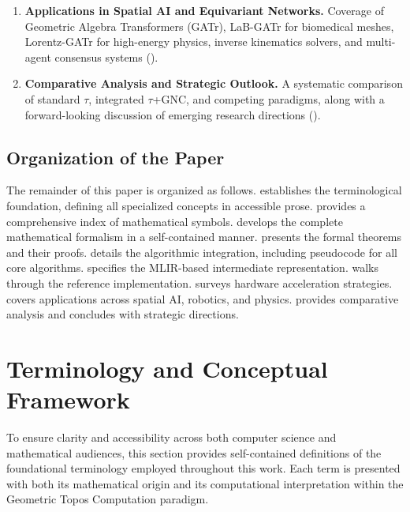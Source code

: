 \documentclass[manuscript, nonacm, review=false]{acmart}
\theoremstyle{definition}
\theoremstyle{plain}
\newcommand{\toposLang}{\ensuremath{\tau}\text{-Lang}}
\begin{document}
\begin{enumerate}[label=\textbf{C\arabic*.}]
    \item \textbf{Applications in Spatial AI and Equivariant Networks.} Coverage of Geometric Algebra Transformers (GATr), LaB-GATr for biomedical meshes, Lorentz-GATr for high-energy physics, inverse kinematics solvers, and multi-agent consensus systems ().
    
    \item \textbf{Comparative Analysis and Strategic Outlook.} A systematic comparison of standard \toposLang{}, integrated \toposLang{}+GNC, and competing paradigms, along with a forward-looking discussion of emerging research directions ().
\end{enumerate}


\subsection{Organization of the Paper}
\label{subsec:organization}

The remainder of this paper is organized as follows.  establishes the terminological foundation, defining all specialized concepts in accessible prose.  provides a comprehensive index of mathematical symbols.  develops the complete mathematical formalism in a self-contained manner.  presents the formal theorems and their proofs.  details the algorithmic integration, including pseudocode for all core algorithms.  specifies the MLIR-based intermediate representation.  walks through the reference implementation.  surveys hardware acceleration strategies.  covers applications across spatial AI, robotics, and physics.  provides comparative analysis and concludes with strategic directions.



\section{Terminology and Conceptual Framework}
\label{sec:terminology}

To ensure clarity and accessibility across both computer science and mathematical audiences, this section provides self-contained definitions of the foundational terminology employed throughout this work. Each term is presented with both its mathematical origin and its computational interpretation within the Geometric Topos Computation paradigm.
\end{document}
